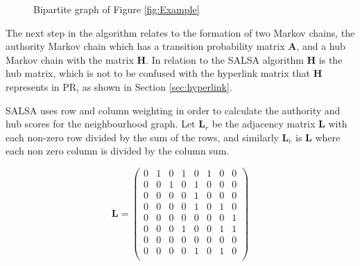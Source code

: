 \documentclass[11pt]{report}
\begin{document}
\begin{figure}[h!]
\centering
{}\caption{Bipartite graph of Figure \ref{fig:Example} } \label{fig:bipartite}
\end{figure}

The next step in the algorithm relates to the formation of two Markov chains, the authority Markov chain which has a transition probability matrix \textbf{A}, and a hub Markov chain with the matrix \textbf{H}. In relation to the SALSA algorithm \textbf{H} is the hub matrix, which is not to be confused with the hyperlink matrix that \textbf{H} represents in PR, as shown in Section \ref{sec:hyperlink}.  

SALSA uses row and column weighting in order to calculate the authority and hub scores for the neighbourhood graph. Let $\textbf{L}_r$ be the adjacency matrix \textbf{L} with each non-zero row divided by the sum of the rows, and similarly $\textbf{L}_c$ is \textbf{L} where each non zero column is divided by the column sum.

\begin{equation*}
\textbf{L}=\left(
\begin{array}{cccccccc}
0 & 1 & 0 & 1 & 0 & 1 & 0 & 0 \\
0 & 0 & 1 & 0 & 1 & 0 & 0 & 0 \\
0 & 0 & 0 & 0 & 1 & 0 & 0 & 0 \\
0 & 0 & 0 & 0 & 1 & 0 & 1 & 0 \\
0 & 0 & 0 & 0 & 0 & 0 & 0 & 1 \\
0 & 0 & 0 & 1 & 0 & 0 & 1 & 1 \\
0 & 0 & 0 & 0 & 0 & 0 & 0 & 0 \\
0 & 0 & 0 & 0 & 1 & 0 & 1 & 0 \\
\end{array}
\right)
\end{equation*}
\end{document}
